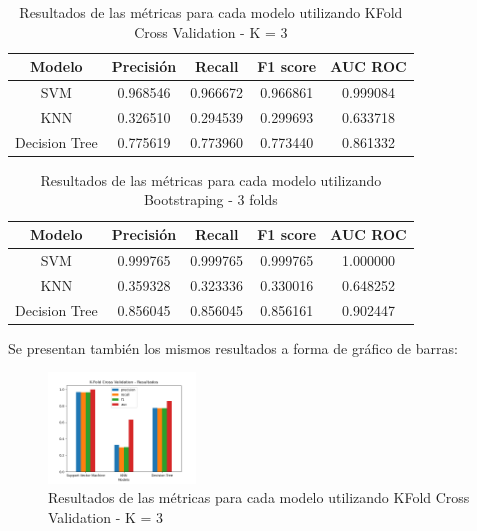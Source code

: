 \documentclass[conference]{IEEEtran}
\begin{document}
\begin{center}
  \begin{table}[ht]
    \centering
    \begin{tabular}{|c|c|c|c|c|}
    \hline
    Modelo                 & Precisión & Recall   & F1 score & AUC ROC  \\
    \hline
    SVM & 0.968546  & 0.966672 & 0.966861 & 0.999084 \\
    \hline
    KNN                    & 0.326510  & 0.294539 & 0.299693 & 0.633718 \\
    \hline
    Decision Tree          & 0.775619  & 0.773960 & 0.773440 & 0.861332 \\ 
    \hline
    \end{tabular}
    \caption{Resultados de las métricas para cada modelo utilizando KFold Cross Validation - K = 3}
    \label{tab:results_kfold}
  \end{table}
\end{center}


\begin{center}
  \begin{table}[ht]
    \centering
    \begin{tabular}{|c|c|c|c|c|}
    \hline
    Modelo                 & Precisión & Recall   & F1 score & AUC ROC  \\
    \hline
    SVM & 0.999765  & 0.999765 & 0.999765 & 1.000000 \\
    \hline
    KNN                    & 0.359328  & 0.323336 & 0.330016 & 0.648252 \\
    \hline
    Decision Tree          & 0.856045  & 0.856045 & 0.856161 & 0.902447 \\ 
    \hline
    \end{tabular}
    \caption{Resultados de las métricas para cada modelo utilizando Bootstraping - 3 folds}
    \label{tab:results_bootstrap}
  \end{table}
\end{center}

Se presentan también los mismos resultados a forma de gráfico de barras:

\begin{figure}[ht]
    \centering
    \includegraphics[width=0.35\textwidth]{images/kfold_results.png}
    \caption{Resultados de las métricas para cada modelo utilizando KFold Cross Validation - K = 3}
    \label{fig:kfold_results}
\end{figure}
\end{document}
